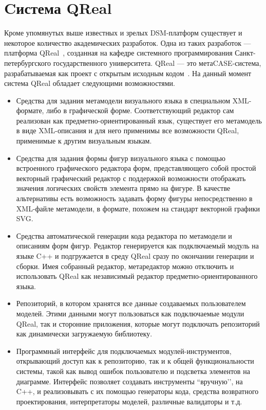 \documentclass[a4paper]{article}
\begin{document}
{\section {Cистема QReal}
Кроме упомянутых выше известных и зрелых DSM-платформ существует и некоторое количество академических разработок. Одна из таких разработок --- платформа QReal~\cite{qReal}, созданная на кафедре системного программирования Санкт-петербургского государственного университета. QReal --- это метаCASE-система, разрабатываемая как проект с открытым исходным кодом~\cite{qRealGithub}. На данный момент система QReal обладает следующими возможностями.
\begin{itemize}
  \item Средства для задания метамодели визуального  языка в специальном XML-формате, либо в графической форме. Соответствующий редактор сам реализован как предметно-ориентированный язык, существует его метамодель в виде XML-описания и для него применимы все возможности QReal, применимые к другим визуальным языкам.
  \item Средства для задания формы фигур визуального языка с помощью встроенного графического редактора форм, представляющего собой простой векторный графический редактор с поддержкой возможности отображать значения логических свойств элемента прямо на фигуре. В качестве альтернативы есть возможность задавать форму фигуры непосредственно в XML-файле метамодели, в формате, похожем на стандарт векторной графики SVG.
  \item Средства автоматической генерации кода редактора по метамодели и описаниям форм фигур. Редактор генерируется как подключаемый модуль на языке C++ и подгружается в среду QReal сразу по окончании генерации и сборки. Имея собранный редактор, метаредактор можно отключить и использовать QReal как независимый редактор предметно-ориентированного языка.
  \item Репозиторий, в котором хранятся все данные создаваемых пользователем моделей. Этими данными могут пользоваться как подключаемые модули QReal, так и сторонние приложения, которые могут подключать репозиторий как динамически загружаемую библиотеку.
  \item Программный интерфейс для подключаемых модулей-инструментов, открывающий доступ как к репозиторию, так и к общей функциональности системы, такой как вывод ошибок пользователю и подсветка элементов на диаграмме. Интерфейс позволяет создавать инструменты ``вручную’’, на C++, и реализовывать с их помощью генераторы кода, средства возвратного проектирования, интерпретаторы моделей, различные валидаторы и т.д.
\end{itemize}

}
\end{document}

